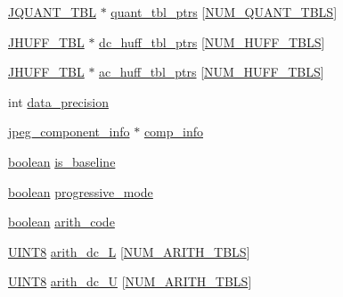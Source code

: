 \begin{DoxyCompactItemize}
\item 
\hyperlink{structJQUANT__TBL}{J\+Q\+U\+A\+N\+T\+\_\+\+T\+B\+L} $\ast$ \hyperlink{structjpeg__decompress__struct_a42be2e7197a38cf83e6cebbaac006ca6}{quant\+\_\+tbl\+\_\+ptrs} \mbox{[}\hyperlink{jpeglib_8h_ab3254a23612ea48615001fffc0c9f691}{N\+U\+M\+\_\+\+Q\+U\+A\+N\+T\+\_\+\+T\+B\+L\+S}\mbox{]}
\item 
\hyperlink{structJHUFF__TBL}{J\+H\+U\+F\+F\+\_\+\+T\+B\+L} $\ast$ \hyperlink{structjpeg__decompress__struct_a805ecdbfbc59d66a6879de06dc4c35e0}{dc\+\_\+huff\+\_\+tbl\+\_\+ptrs} \mbox{[}\hyperlink{jpeglib_8h_a6b12985705944e0623b671f29dc5722e}{N\+U\+M\+\_\+\+H\+U\+F\+F\+\_\+\+T\+B\+L\+S}\mbox{]}
\item 
\hyperlink{structJHUFF__TBL}{J\+H\+U\+F\+F\+\_\+\+T\+B\+L} $\ast$ \hyperlink{structjpeg__decompress__struct_a8d6e49569f3edc0ad43ffa5d6a95bb48}{ac\+\_\+huff\+\_\+tbl\+\_\+ptrs} \mbox{[}\hyperlink{jpeglib_8h_a6b12985705944e0623b671f29dc5722e}{N\+U\+M\+\_\+\+H\+U\+F\+F\+\_\+\+T\+B\+L\+S}\mbox{]}
\item 
int \hyperlink{structjpeg__decompress__struct_ad55d8fc56faa42d05d1a80ad84ce3e9c}{data\+\_\+precision}
\item 
\hyperlink{structjpeg__component__info}{jpeg\+\_\+component\+\_\+info} $\ast$ \hyperlink{structjpeg__decompress__struct_afb7ab593b5699842965eccb64e6e200a}{comp\+\_\+info}
\item 
\hyperlink{jmorecfg_8h_a7c6368b321bd9acd0149b030bb8275ed}{boolean} \hyperlink{structjpeg__decompress__struct_a7ba5fd9c43f0bd3161f1fc618aa39e37}{is\+\_\+baseline}
\item 
\hyperlink{jmorecfg_8h_a7c6368b321bd9acd0149b030bb8275ed}{boolean} \hyperlink{structjpeg__decompress__struct_a6e2f9fd1cba287dc632070f3c8390d1c}{progressive\+\_\+mode}
\item 
\hyperlink{jmorecfg_8h_a7c6368b321bd9acd0149b030bb8275ed}{boolean} \hyperlink{structjpeg__decompress__struct_aa59d02c7dfa58e22321c1f5fa154b151}{arith\+\_\+code}
\item 
\hyperlink{jmorecfg_8h_adfb9a8ea1dd59f151065f763e1e9acd6}{U\+I\+N\+T8} \hyperlink{structjpeg__decompress__struct_a746b5ecfe0401a1ffe423191d4b929b0}{arith\+\_\+dc\+\_\+\+L} \mbox{[}\hyperlink{jpeglib_8h_a4efb0fccc8d9db72ca18f32a26fad6ab}{N\+U\+M\+\_\+\+A\+R\+I\+T\+H\+\_\+\+T\+B\+L\+S}\mbox{]}
\item 
\hyperlink{jmorecfg_8h_adfb9a8ea1dd59f151065f763e1e9acd6}{U\+I\+N\+T8} \hyperlink{structjpeg__decompress__struct_af181cece11c6bb960cb97f648f0e67aa}{arith\+\_\+dc\+\_\+\+U} \mbox{[}\hyperlink{jpeglib_8h_a4efb0fccc8d9db72ca18f32a26fad6ab}{N\+U\+M\+\_\+\+A\+R\+I\+T\+H\+\_\+\+T\+B\+L\+S}\mbox{]}

\end{DoxyCompactItemize}
